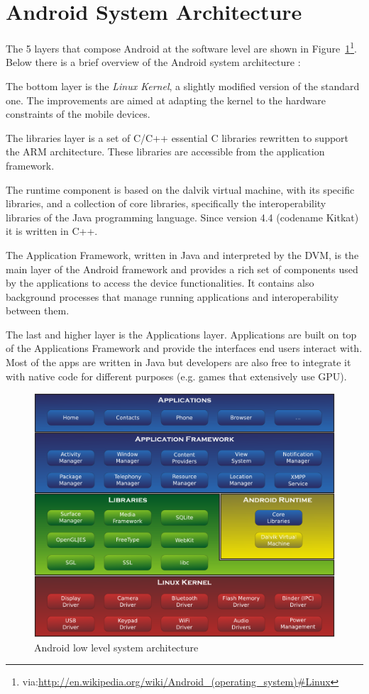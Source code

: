 \section{Android System Architecture}
\label{sec:bg_architecture}

The 5 layers that compose Android at the software level are shown in
Figure~\ref{fig:bg_architecture}\footnote{via:\url{http://en.wikipedia.org/wiki/Android\_(operating_system)\#Linux}}. Below
there is a brief overview of the Android system architecture \cite{ref13}:
\begin{enumerate*}
  \item The bottom layer is the \textit{Linux Kernel}, a slightly modified version of the standard one. The improvements are aimed at adapting the kernel to the hardware constraints of the mobile devices. 
  \item The libraries layer is a set of C/C++ essential C libraries rewritten to support the ARM architecture. These libraries are accessible from the application framework. 
  \item The runtime component is based on the dalvik virtual machine, with its specific libraries, and a collection of core libraries, specifically the interoperability libraries of the Java programming language. Since version 4.4 (codename Kitkat) it is written in C++. 
  \item The Application Framework, written in Java and interpreted by the DVM, is the main layer of the Android framework and provides a rich set of components used by the applications to access the device functionalities. It contains also background processes that manage running applications and interoperability between them. 
  \item The last and higher layer is the Applications layer. Applications are built on top of the Applications Framework and provide the interfaces end users interact with. Most of the apps are written in Java but developers are also free to integrate it with native code for different purposes (e.g. games that extensively use GPU).
\end{enumerate*}

\begin{figure}[!h]
    \centering
    \includegraphics[width=1\textwidth]{./img/architecture/architecture.pdf}
    \caption{Android low level system architecture}
    \label{fig:bg_architecture}
\end{figure}
